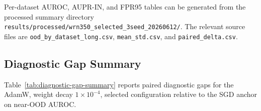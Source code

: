 Per-dataset AUROC, AUPR-IN, and FPR95 tables can be generated from the processed
summary directory \texttt{results/processed/wrn350\_selected\_3seed\_20260612/}.
The relevant source files are \texttt{ood\_by\_dataset\_long.csv},
\texttt{mean\_std.csv}, and \texttt{paired\_delta.csv}.

\subsection{Diagnostic Gap Summary}
\label{app:diagnostic-gap-summary}

Table~\ref{tab:diagnostic-gap-summary} reports paired diagnostic gaps for the
AdamW, weight decay \(1{\times}10^{-4}\), selected configuration relative to the
SGD anchor on near-OOD AUROC.


